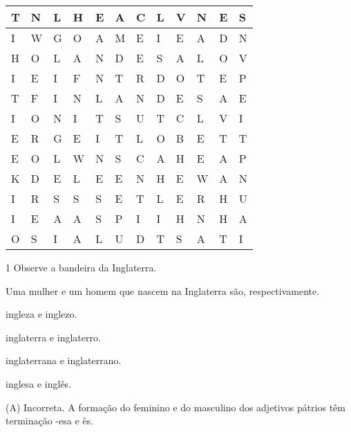 \begin{longtable}[]{@{}llllllllllll@{}}
\toprule
T & N & L & H & E & A & C & L & V & N & E & S\tabularnewline
\midrule
\endhead
I & W & G & O & A & M & E & I & E & A & D & N\tabularnewline
H & O & L & A & N & D & E & S & A & L & O & V\tabularnewline
I & E & I & F & N & T & R & D & O & T & E & P\tabularnewline
T & F & I & N & L & A & N & D & E & S & A & E\tabularnewline
I & O & N & I & T & S & U & T & C & L & V & I\tabularnewline
E & R & G & E & I & T & L & O & B & E & T & T\tabularnewline
E & O & L & W & N & S & C & A & H & E & A & P\tabularnewline
K & D & E & L & E & E & N & H & E & W & A & N\tabularnewline
I & R & S & S & S & E & T & L & E & R & H & U\tabularnewline
I & E & A & A & S & P & I & I & H & N & H & A\tabularnewline
O & S & I & A & L & U & D & T & S & A & T & I\tabularnewline
\bottomrule
\end{longtable}



\num{1} Observe a bandeira da Inglaterra. %



Uma mulher e um homem que nascem na Inglaterra são, respectivamente.

\begin{escolha}
\item ingleza e inglezo.

\item inglaterra e inglaterro.

\item inglaterrana e inglaterrano.

\item inglesa e inglês.
\end{escolha}


(A) Incorreta. A formação do feminino e do masculino dos adjetivos
pátrios têm terminação -esa e ês.

